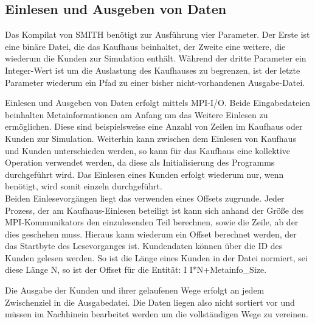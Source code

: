 \subsection{Einlesen und Ausgeben von Daten}
Das Kompilat von SMITH benötigt zur Ausführung vier Parameter. Der Erste ist eine binäre Datei, die das Kaufhaus beinhaltet, der Zweite eine weitere, die wiederum die Kunden zur Simulation enthält. Während der dritte Parameter ein Integer-Wert ist um die Auslastung des Kaufhauses zu begrenzen, ist der letzte Parameter wiederum ein Pfad zu einer bisher nicht-vorhandenen Ausgabe-Datei.


Einlesen und Ausgeben von Daten erfolgt mittels MPI-I/O. Beide Eingabedateien beinhalten Metainformationen am Anfang um das Weitere Einlesen zu ermöglichen. Diese sind beispielsweise eine Anzahl von Zeilen im Kaufhaus oder Kunden zur Simulation.
Weiterhin kann zwischen dem Einlesen von Kaufhaus und Kunden unterschieden werden, so kann für das Kaufhaus eine kollektive Operation verwendet werden, da diese als Initialisierung des Programms durchgeführt wird. Das Einlesen eines Kunden erfolgt wiederum nur, wenn benötigt, wird somit einzeln durchgeführt.\\
Beiden Einlesevorgängen liegt das verwenden eines Offsets zugrunde. Jeder Prozess, der am Kaufhaus-Einlesen beteiligt ist kann sich anhand der Größe des MPI-Kommunikators den einzulesenden Teil berechnen, sowie die Zeile, ab der dies geschehen muss. Hieraus kann wiederum ein Offset berechnet werden, der das Startbyte des Lesevorganges ist. Kundendaten können über die ID des Kunden gelesen werden. So ist die Länge eines Kunden in der Datei normiert, sei diese Länge N, so ist der Offset für die Entität: I I*N+Metainfo\_Size.

Die Ausgabe der Kunden und ihrer gelaufenen Wege erfolgt an jedem Zwischenziel in die Ausgabedatei. Die Daten liegen also nicht sortiert vor und müssen im Nachhinein bearbeitet werden um die vollständigen Wege zu vereinen.
